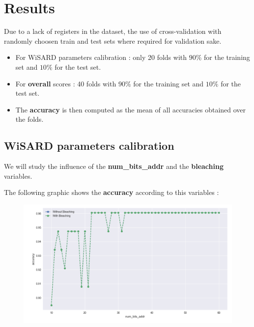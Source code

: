 \documentclass[a4paper, 11pt]{article}
\begin{document}
\section{Results}
Due to a lack of registers in the dataset, the use of cross-validation
with randomly choosen train and test sets where required for validation sake.

\begin{itemize}
   \item For WiSARD parameters calibration : only 20 folds with $90\%$ for
     the training set and $10\%$ for the test set.
   \item For \textbf{overall} scores : 40 folds with $90\%$ for
     the training set and $10\%$ for the test set.
    \item The \textbf{accuracy} is then computed as the mean of all accuracies obtained
      over the folds.
\end{itemize}

\subsection{WiSARD parameters calibration}

We will study the influence of the \textbf{num\_bits\_addr} and the
\textbf{bleaching} variables.

The following graphic shows the \textbf{accuracy} according to this variables :
\begin{figure}[H]
\begin{center}
  \includegraphics[width=\linewidth]{../figures_trabalho_final/wisard_parameters_results.png}
\end{center}
\end{figure}
\end{document}
